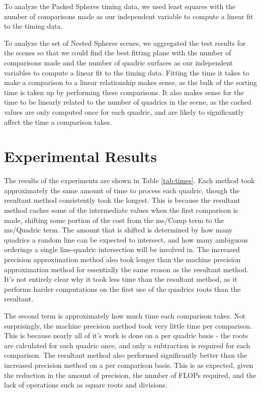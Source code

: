 \documentclass{cccg16}
\begin{document}
To analyze the Packed Spheres timing data, we used least
squares with the number of comparisons made as our independent
variable to compute a linear fit to the timing data.

To analyze the set of Nested Spheres scenes, we aggregated the test
results for the scenes so that we could find the best fitting plane
with the number of comparisons made and the number of quadric surfaces
as our independent variables to compute a linear fit to the timing
data.  Fitting the time it takes to make a comparison to a linear
relationship makes sense, as the bulk of the sorting time is taken up
by performing these comparisons.  It also makes sense for the time to
be linearly related to the number of quadrics in the scene, as the
cached values are only computed once for each quadric, and are likely
to significantly affect the time a comparison takes.

\section{Experimental Results}
The results of the experiments are shown in Table \ref{tab:times}.
Each method took approximately the same amount of time to process each
quadric, though the resultant method consistently took the longest.
This is because the resultant method caches some of the intermediate
values when the first comparison is made, shifting some portion of the
cost from the ms/Comp term to the ms/Quadric term.  The
amount that is shifted is determined by how many quadrics a random
line can be expected to intersect, and how many ambiguous orderings a
single line-quadric intersection will be involved in.  The increased
precision approximation method also took longer than the machine
precision approximation method for essentially the same reason as the
resultant method.  It's not entirely clear why it took less time than
the resultant method, as it performs harder computations on the first
use of the quadrics roots than the resultant.

The second term is approximately how much time each comparison takes.
Not surprisingly, the machine precision method took very little time
per comparison.  This is because nearly all of it's work is done on a
per quadric basis - the roots are calculated for each quadric once,
and only a subtraction is required for each comparison. The resultant
method also performed significantly better than the increased
precision method on a per comparison basis.  This is as expected,
given the reduction in the amount of precision, the number of FLOPs
required, and the lack of operations such as square roots and
divisions.
\end{document}
